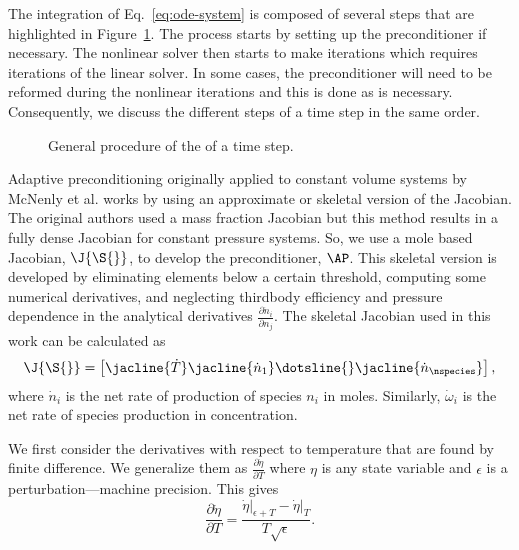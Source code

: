 The integration of Eq.~\eqref{eq:ode-system} is composed of several steps that are highlighted in Figure~\ref{f:integration_process}.
The process starts by setting up the preconditioner if necessary.
The nonlinear solver then starts to make iterations which requires iterations of the linear solver.
In some cases, the preconditioner will need to be reformed during the nonlinear iterations and this is done as is necessary.
Consequently, we discuss the different steps of a time step in the same order.

\begin{figure}[h!]
    \centering
    \IntegrationOverview[0.85]{}
    \caption{General procedure of the of a time step.}
    \label{f:integration_process}
\end{figure}

\label{sec:methods-adaptive}
Adaptive preconditioning originally applied to constant volume systems
by McNenly et al.\cite{mcnenly_faster_2015} works by using an
approximate or skeletal version of the Jacobian.
The original authors used a mass fraction Jacobian but this method results in a fully dense Jacobian for constant pressure systems.
So, we use a mole based Jacobian, $\J{\S{}}$, to develop the preconditioner, $\AP$.
This skeletal version is developed by eliminating elements below a certain threshold, computing some numerical derivatives, and neglecting thirdbody efficiency and pressure dependence in the analytical derivatives $\frac{\partial \dot{n}_i}{\partial n_j}$.
The skeletal Jacobian used in this work can be calculated as
\begin{equation}
    \J{\S{}} =
    \begin{bmatrix}
        \jacline{\dot{T}}
        \jacline{\dot{n}_{1}}
        \dotsline{}
        \jacline{\dot{n}_{\nspecies}}
    \end{bmatrix},
\end{equation}
where $\dot{n}_i$ is the net rate of production of species $n_i$ in moles.
Similarly, $\dot{\omega}_i$ is the net rate of species production in concentration.

%
%
We first consider the derivatives with respect to temperature that are found by finite difference. We generalize them as $\frac{\partial \dot{\eta}}{\partial T}$ where $\eta$ is any state variable and $\epsilon$ is a perturbation---machine precision.
This gives
\begin{equation}
    \label{eq:temp-dervs}
    \frac{\partial \dot{\eta}}{\partial T} = \frac{\dot{\eta}\big\vert_{\epsilon+T}-\dot{\eta}\big\vert_{T}}{T\sqrt{\epsilon}}.
\end{equation}

